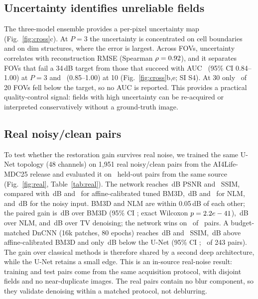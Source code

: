 \documentclass[10pt]{article}
\begin{document}
\subsection{Uncertainty identifies unreliable fields}
The three-model ensemble provides a per-pixel uncertainty map
(Fig.~\ref{fig:cross}c). At $P=3$ the uncertainty is concentrated on
cell boundaries and on dim structures, where the error is largest. Across FOVs,
uncertainty correlates with reconstruction RMSE (Spearman $\rho=0.92$), and
it separates FOVs that fail a 34\,dB target from those that succeed with AUC
\AucThree\ (95\% CI 0.84--1.00) at $P=3$ and \AucTen\ (0.85--1.00) at 10
(Fig.~\ref{fig:cross}b,e; SI S4). At 30 only
\NFailThirty\ of 20 FOVs fell below the target, so no AUC is reported. This provides a practical quality-control signal: fields with high
uncertainty can be re-acquired or interpreted conservatively without a
ground-truth image.



\begin{table}[t]
\centering
\caption{Cross-dataset PSNR at $P=30$. BBBC014 uses its 20 test
FOVs; each external dataset is split into five validation fields for TV tuning
and 15 held-out fields for evaluation. The model is trained only on BBBC014
channel~1 and external evaluation is zero-shot; TV deconvolution is tuned per
dataset on its five validation fields.}
\label{tab:cross}

\end{table}

\subsection{Real noisy/clean pairs}
To test whether the restoration gain survives real noise, we trained the same
U-Net topology (48 channels) on 1{,}951 real noisy/clean pairs from the
AI4Life-MDC25 release
and evaluated it on \RealN\ held-out pairs from the same source
(Fig.~\ref{fig:real}, Table~\ref{tab:real}). The network reaches
\RealUnetP\,dB PSNR and \RealUnetS\ SSIM, compared with \RealBMThreeP\,dB and
\RealBMThreeS\ for affine-calibrated tuned BM3D, \RealNlmP\,dB and \RealNlmS\ for NLM, and
\RealNoisyP\,dB for the noisy input. BM3D and NLM are within 0.05\,dB of each
other; the paired gain is \RealGain\,dB over BM3D (95\% CI \RealCI; exact
Wilcoxon $p=2.2e-41$), \RealGainNlm\,dB over NLM, and \RealGainTv\,dB over
TV denoising; the network wins on \RealWins\ of \RealN\ pairs. A budget-matched
DnCNN (16k patches, 80 epochs) reaches \RealDncnnP\,dB and \RealDncnnS\ SSIM,
\RealDncnnGain\,dB above affine-calibrated BM3D and only
\RealUnetGainDncnn\,dB below the U-Net (95\% CI \RealUnetDncnnCI;
\RealUnetDncnnWins\ of 243 pairs). The gain over classical methods is therefore
shared by a second deep architecture, while the U-Net retains a small edge. This is an
in-source real-noise result: training and test pairs come from the same
acquisition protocol, with disjoint fields and no near-duplicate images. The
real pairs contain no blur component, so they validate denoising within a
matched protocol, not deblurring.
\end{document}
